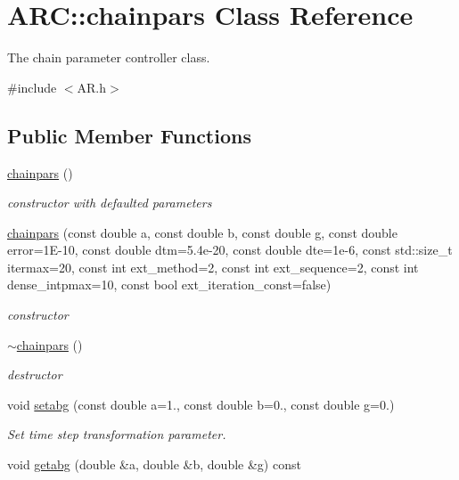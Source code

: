 \hypertarget{classARC_1_1chainpars}{}\section{A\+RC\+:\+:chainpars Class Reference}
\label{classARC_1_1chainpars}


The chain parameter controller class.  




{\ttfamily \#include $<$A\+R.\+h$>$}

\subsection*{Public Member Functions}
\begin{DoxyCompactItemize}
\item 
\hyperlink{classARC_1_1chainpars_a2019a609d85e2b801f306ac8c7f268ab}{chainpars} ()
\begin{DoxyCompactList}\small\item\em constructor with defaulted parameters \end{DoxyCompactList}\item 
\hyperlink{classARC_1_1chainpars_a26235d742aafa97dcaad75a5db74141e}{chainpars} (const double a, const double b, const double g, const double error=1\+E-\/10, const double dtm=5.\+4e-\/20, const double dte=1e-\/6, const std\+::size\+\_\+t itermax=20, const int ext\+\_\+method=2, const int ext\+\_\+sequence=2, const int dense\+\_\+intpmax=10, const bool ext\+\_\+iteration\+\_\+const=false)
\begin{DoxyCompactList}\small\item\em constructor \end{DoxyCompactList}\item 
\hyperlink{classARC_1_1chainpars_a032873f782645efb6e60dc77f6d425dc}{$\sim$chainpars} ()
\begin{DoxyCompactList}\small\item\em destructor \end{DoxyCompactList}\item 
void \hyperlink{classARC_1_1chainpars_a37f8af288217cbfc61a3593e21976d06}{setabg} (const double a=1., const double b=0., const double g=0.)
\begin{DoxyCompactList}\small\item\em Set time step transformation parameter. \end{DoxyCompactList}\item 
void \hyperlink{classARC_1_1chainpars_ad89c97941d06711adf5d46e56c5ff247}{getabg} (double \&a, double \&b, double \&g) const 

\end{DoxyCompactItemize}
